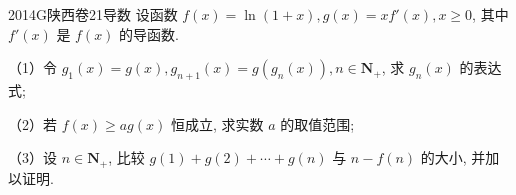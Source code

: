 
\begin{problem}{2014}{G}{陕西卷}{21}{导数}
设函数 $f(x)=\ln(1+x), g(x)=xf'(x), x \ge 0$, 其中 $f'(x)$ 是 $f(x)$ 的导函数.

（1）令 $g_1(x)=g(x), g_{n+1}(x)=g(g_n(x)), n \in \mathbf{N}_+$, 求 $g_n(x)$ 的表达式;

（2）若 $f(x) \ge ag(x)$ 恒成立, 求实数 $a$ 的取值范围;

（3）设 $n \in \mathbf{N}_+$, 比较 $g(1)+g(2)+\cdots+g(n)$ 与 $n-f(n)$ 的大小, 并加以证明.
\end{problem}